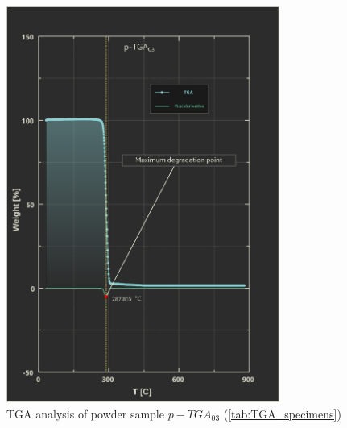 \documentclass{article}
\begin{document}
            \begin{figure}[h!]
                \centering
                \includegraphics[width=0.8\textwidth]{Pictures/Thermal_analysis_plots/TGA_catalogued/p-TGA03.eps}
                \caption{TGA analysis of powder sample $p-TGA_{03}$ (\ref{tab:TGA_specimens})}
                \label{fig:TGA_03}
            \end{figure}
\end{document}

